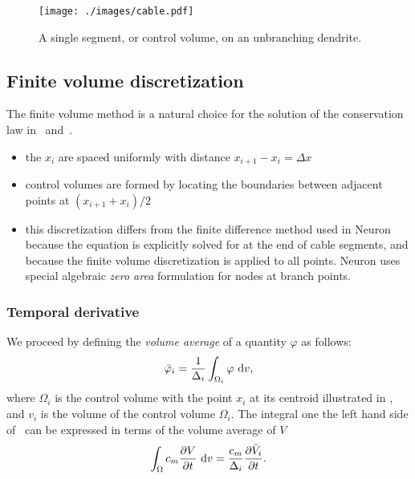 \begin{figure}
    \begin{center}
        \texttt{[image: ./images/cable.pdf]}
    \end{center}
    \caption{A single segment, or control volume, on an unbranching dendrite.}
    \label{fig:segment}
\end{figure}

\subsection{Finite volume discretization}
The finite volume method is a natural choice for the solution of the conservation law in~ and~.

\begin{itemize}
    \item   the $x_i$ are spaced uniformly with distance $x_{i+1}-x_{i} = \Delta x$
    \item   control volumes are formed by locating the boundaries between adjacent points at $(x_{i+1}+x_{i})/2$
    \item   this discretization differs from the finite difference method used in Neuron because the equation is explicitly solved for at the end of cable segments, and because the finite volume discretization is applied to all points. Neuron uses special algebraic \emph{zero area} formulation for nodes at branch points.
\end{itemize}

\subsubsection{Temporal derivative}
We proceed by defining the \emph{volume average} of a quantity $\varphi$ as follows:
\begin{equation}
    \bar{\varphi}_i = \frac{1}{\Delta_i} \int_{\Omega_i}{\varphi}~\text{d}{v},
\end{equation}
where $\Omega_i$ is the control volume with the point $x_i$ at its centroid illustrated in , and $v_i$ is the volume of the control volume $\Omega_i$.
The integral one the left hand side of~ can be expressed in terms of the volume average of $V$
\begin{equation}
    \int_{\Omega}{c_m \frac{\partial{V}}{\partial{t}} } ~\text{d}{v} = \frac{c_m}{\Delta_i} \frac{\partial{\bar{V}_i}}{\partial{t}}.
    \label{eq:dvdt}
\end{equation}

